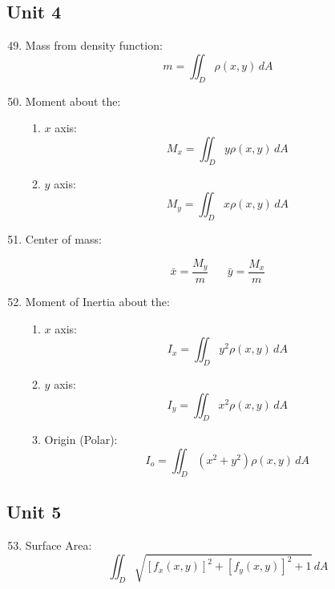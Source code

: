 \documentclass[12pt]{article}
\begin{document}
\subsection{Unit 4}

\begin{enumerate}
    \setcounter{enumi}{48}

  \item Mass from density function:
    $$m=\iint_D \rho(x,y)\,dA$$

  \item Moment about the:

    \begin{enumerate}

      \item $x$ axis:
        $$M_x=\iint_D y\rho(x,y)\,dA$$

      \item $y$ axis:
        $$M_y=\iint_D x\rho(x,y)\,dA$$

    \end{enumerate}

  \item Center of mass:

    $$\bar{x}=\frac{M_y}{m}\,\,\,\,\,\,\,\,\,\,\bar{y}=\frac{M_x}{m}$$

  \item Moment of Inertia about the:

    \begin{enumerate}

      \item $x$ axis:
        $$I_x=\iint_D y^2\rho(x,y)\,dA$$

      \item $y$ axis:
        $$I_y=\iint_D x^2\rho(x,y)\,dA$$

      \item Origin (Polar):
        $$I_o=\iint_D (x^2+y^2)\rho(x,y)\,dA$$

    \end{enumerate}

\end{enumerate}

\subsection{Unit 5}

\begin{enumerate}
    \setcounter{enumi}{52}

  \item Surface Area:
    $$\iint_D \sqrt{[f_x(x,y)]^2+[f_y(x,y)]^2+1}\,dA$$

\end{enumerate}
\end{document}
